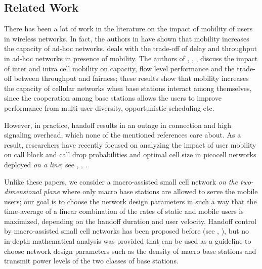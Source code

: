 \documentclass[10pt,journal]{IEEEtran}
\begin{document}
\subsection{Related Work}\label{subsection:related_work}
There has been a lot of work in the literature on the impact of mobility of users in wireless networks. In fact, the authors in 
\cite{grossglauser-tse02mobility-increases-capacity} have shown that mobility increases the capacity of ad-hoc networks. 
\cite{bansal-liu03capacity-delay-mobility-ahn} deals with the trade-off of delay and throughput in ad-hoc networks in presence of mobility. 
The authors of \cite{bonald-etal09flow-level-performance-mobility}, 
\cite{bonald-etal04mobility-flow-level-data-systems}, \cite{borst-etal12capacity-with-mobility},  
\cite{orlik-rappaport01handoff-arrival-process-cellular} discuss the impact of inter and intra cell mobility on capacity, flow level performance and 
the trade-off between throughput and fairness; these results show that mobility increases the capacity of cellular networks when base stations 
interact among themselves, since the cooperation among base stations allows the users to improve performance from multi-user diversity, 
opportunistic scheduling etc. 

However, in practice, handoff 
results in an outage in connection and high signaling overhead, which none of the mentioned references care about. 
As a result, researchers have recently focused on analyzing the impact of user mobility on call block and call drop probabilities and 
optimal cell size in picocell networks deployed {\em on a line}; 
see  \cite{ramanath-etal10spatial-queueing-mobility-wiopt}, \cite{kavitha-etal11spatial-queueing-picocells},  
\cite{ramanath-etal10mobility-small-cell}. 

Unlike these papers, we consider a macro-assisted small cell network 
{\em on the two-dimensional plane} where only macro base stations 
are allowed to serve the mobile users; our goal is to choose the network design parameters in such a way that the time-average of a linear combination 
of the rates of static and mobile users is maximized, depending on the handoff duration and user velocity. 
Handoff control by macro-assisted small cell networks has been proposed before (see \cite{lee-syu14handover-macro-assisted-small-cell-networks}, 
\cite{ishii-etal12novel-architecture-LTE-B}), but no in-depth mathematical analysis was provided that can be used as a guideline to choose 
network design parameters such as the density of macro base stations and transmit power levels of the two classes of base stations.
\end{document}
